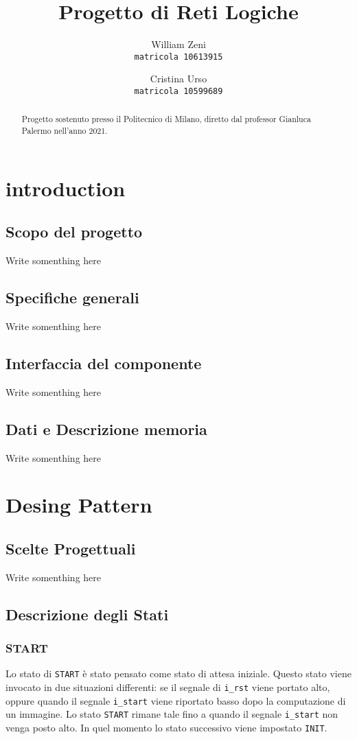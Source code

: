 \documentclass{article}
\title{Progetto di Reti Logiche}
\author{
  William Zeni\\
  \texttt{matricola 10613915}
  \and
  Cristina Urso\\
  \texttt{matricola 10599689}
}
\begin{document}
\maketitle

\begin{abstract}
  \centering
  Progetto sostenuto presso il Politecnico di Milano, diretto dal professor Gianluca Palermo nell'anno 2021.
\end{abstract}

\section{introduction}
\subsection{Scopo del progetto}
Write somenthing here

\subsection{Specifiche generali}
Write somenthing here

\subsection{Interfaccia del componente}
Write somenthing here

\subsection{Dati e Descrizione memoria}
Write somenthing here

\section{Desing Pattern}
\subsection{Scelte Progettuali}
Write somenthing here

\subsection{Descrizione degli Stati}
\subsubsection{START}
Lo stato di \texttt{START} è stato pensato come stato di attesa iniziale. Questo stato viene invocato in due situazioni differenti: se il segnale di \texttt{i\_rst} viene portato alto, oppure quando il segnale \texttt{i\_start} viene riportato basso dopo la computazione di un immagine. Lo stato \texttt{START} rimane tale fino a quando il segnale \texttt{i\_start} non venga posto alto. In quel momento lo stato successivo viene impostato \texttt{INIT}.
\end{document}

